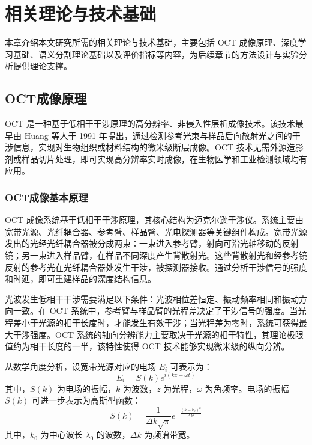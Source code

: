 \clearpage

\section{相关理论与技术基础}

本章介绍本文研究所需的相关理论与技术基础，主要包括 OCT 成像原理、深度学习基础、语义分割理论基础以及评价指标等内容，为后续章节的方法设计与实验分析提供理论支撑。

\subsection{OCT成像原理}

OCT 是一种基于低相干干涉原理的高分辨率、非侵入性层析成像技术。该技术最早由 Huang 等人于 1991 年提出，通过检测参考光束与样品后向散射光之间的干涉信息，实现对生物组织或材料结构的微米级断层成像。OCT 技术无需外源造影剂或样品切片处理，即可实现高分辨率实时成像，在生物医学和工业检测领域均有应用。

\subsubsection{OCT成像基本原理}

OCT 成像系统基于低相干干涉原理，其核心结构为迈克尔逊干涉仪。系统主要由宽带光源、光纤耦合器、参考臂、样品臂、光电探测器等关键组件构成。宽带光源发出的光经光纤耦合器被分成两束：一束进入参考臂，射向可沿光轴移动的反射镜；另一束进入样品臂，在样品不同深度产生背散射光。这些背散射光和经参考镜反射的参考光在光纤耦合器处发生干涉，被探测器接收。通过分析干涉信号的强度和时延，即可重建样品的深度结构信息。

光波发生低相干干涉需要满足以下条件：光波相位差恒定、振动频率相同和振动方向一致。在 OCT 系统中，参考臂与样品臂的光程差决定了干涉信号的强度。当光程差小于光源的相干长度时，才能发生有效干涉；当光程差为零时，系统可获得最大干涉强度。OCT 系统的轴向分辨能力主要取决于光源的相干特性，其理论极限值约为相干长度的一半，该特性使得 OCT 技术能够实现微米级的纵向分辨。

从数学角度分析，设宽带光源对应的电场 $E_i$ 可表示为：
\begin{equation}
E_i = S(k) e^{i(kz - \omega t)}
\label{eq:oct_electric_field}
\end{equation}
其中，$S(k)$ 为电场的振幅，$k$ 为波数，$z$ 为光程，$\omega$ 为角频率。电场的振幅 $S(k)$ 可进一步表示为高斯型函数：
\begin{equation}
S(k) = \frac{1}{\Delta k \sqrt{\pi}} e^{-\frac{(k-k_0)^2}{\Delta k^2}}
\label{eq:oct_amplitude}
\end{equation}
其中，$k_0$ 为中心波长 $\lambda_0$ 的波数，$\Delta k$ 为频谱带宽。

